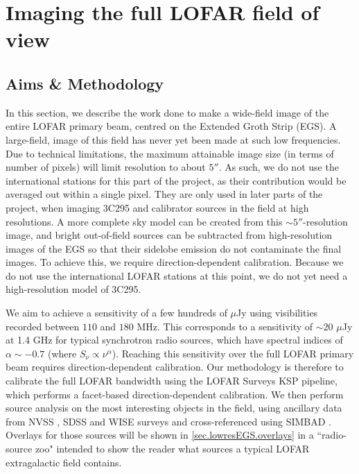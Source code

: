 \chapter{Imaging the full LOFAR field of view}\label{section.EGS.lowres}
\minitoc
\section{Aims \& Methodology}

\pg
In this section, we describe the work done to make a wide-field image of the entire LOFAR primary beam, centred on the Extended Groth Strip (EGS). A large-field, image of this field has never yet been made at such low frequencies. Due to technical limitations, the maximum attainable image size (in terms of number of pixels) will limit resolution to about $5''$. As such, we do not use the international stations for this part of the project, as their contribution would be averaged out within a single pixel. They are only used in later parts of the project, when imaging 3C295 and calibrator sources in the field at high resolutions.
A more complete sky model can be created from this $\sim5''$-resolution image, and %
bright out-of-field sources can be subtracted from high-resolution images of the EGS so that their sidelobe emission do not contaminate the final images. %
To achieve this, we require direction-dependent calibration. Because we do not use the international LOFAR stations at this point, we do not yet need a high-resolution model of 3C295. 

\pg
We aim to achieve a sensitivity of a few hundreds of $\mu$Jy using visibilities recorded between $110$ and $180$ MHz. This corresponds to a sensitivity of $\sim20$ $\mu$Jy at 1.4 GHz for typical synchrotron radio sources, which have spectral indices of $\alpha\sim -0.7$ (where $S_\nu \propto \nu^\alpha$). Reaching this sensitivity over the full LOFAR primary beam requires direction-dependent calibration.
Our methodology is therefore to calibrate the full LOFAR bandwidth using the LOFAR Surveys KSP pipeline, which performs a facet-based direction-dependent calibration. We then perform source analysis on the most interesting objects in the field, using ancillary data from NVSS , SDSS  and WISE  surveys and cross-referenced using SIMBAD . Overlays for those sources will be shown in \cref{sec.lowresEGS.overlays} in a ``radio-source zoo" intended to show the reader what sources a typical LOFAR extragalactic field contains.


